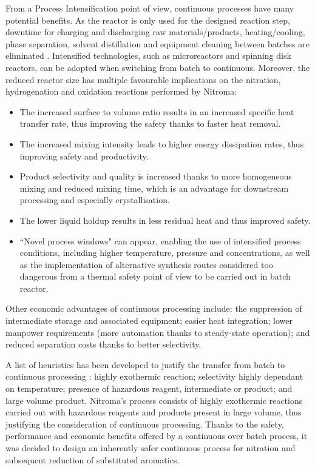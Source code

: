 From a Process Intensification point of view, continuous processes have many potential benefits. As the  reactor is only used for the designed reaction step, downtime for charging and discharging raw materials/products, heating/cooling, phase separation, solvent distillation and equipment cleaning between batches are eliminated \cite{randall_process_2020}. Intensified technologies, such as microreactors and spinning disk reactors, can be adopted when switching from batch to continuous. Moreover, the reduced reactor size has multiple favourable implications on the nitration, hydrogenation and oxidation reactions performed by Nitroma:
\begin{itemize}
    \item The increased surface to volume ratio results in an increased specific heat transfer rate, thus improving the safety thanks to faster heat removal.
    \item The increased mixing intensity leads to higher energy dissipation rates, thus improving safety and productivity.
    \item Product selectivity and quality is increased thanks to more homogeneous mixing and reduced mixing time, which is an advantage for downstream processing and especially crystallisation.
    \item The lower liquid holdup results in less residual heat and thus improved safety.
    \item ``Novel process windows" can appear, enabling the use of intensified process conditions, including higher temperature, pressure and concentrations, as well as the implementation of alternative synthesis routes considered too dangerous from a thermal safety point of view to be carried out in batch reactor.
\end{itemize}
Other economic advantages of continuous processing include: the suppression of intermediate storage and associated equipment; easier heat integration; lower manpower requirements (more automation thanks to steady-state operation); and reduced separation costs thanks to better selectivity.

A list of heuristics has been developed to justify the transfer from batch to continuous processing \cite{randall_process_2020}: highly exothermic reaction; selectivity highly dependant on temperature; presence of hazardous reagent, intermediate or product; and large volume product.
Nitroma's process consists of highly exothermic reactions carried out with hazardous reagents and products present in large volume, thus justifying the consideration of continuous processing. Thanks to the safety, performance and economic benefits offered by a continuous over batch process, it was decided to design an inherently safer continuous process for nitration and subsequent reduction of substituted aromatics.

